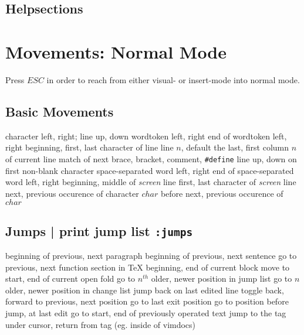
\def\content{\uppercase{vim}}
\def\shortcontent{\content}
\def\versionnumber{1.6}  %
\def\version{v\versionnumber\ \month\ \year}


\mytitle

\shortintro
\shortintroVim

\subsection{Helpsections}	{}

\section{Movements: Normal Mode}	{Press $ESC$ in order to reach from either visual- or insert-mode into normal mode.}
\subsection{Basic Movements}{}
	{character left, right; line up, down }
	{word\or token left, right }
	{end of word\or token left, right}
	{beginning, first, last character of line}
	{line $n$, default the last, first}
	{column $n$ of current line}
\cmdS{\% }	{match of next brace, bracket, comment, {\tt\#define}}
\cmdS{- + }	{line up, down on first non-blank character}
	{space-separated word left, right}
	{end of space-separated word left, right}
	{beginning, middle of {\it screen\/} line}
	{first, last character of {\it screen\/} line}
	{next, previous occurence of character $char$}
	{before next, previous occurence of $char$}

\subsection{Jumps | {print jump list {\tt :jumps}}}	{}
\cmdS{\lapos\ \rapos }	{beginning of previous, next paragraph}
\cmdS{( ) }	{beginning of previous, next sentence}
\cmdS{[[\ ]]}	{go to previous, next function \or \bs section in \TeX}
\cmdS{[\lapos\ ]\rapos}	{beginning, end of current block}
	{move to start, end of current open fold}
	{go to $n^{th}$ older, newer position in jump list}
	{go to $n$ older, newer position in change list}
	{jump back on last edited line}
	{toggle back, forward to previous, next position}
	{go to last exit position}
	{go to position before jump, at last edit}
	{go to start, end of previously operated text}
\cmdS{\ctrl ] \ctrl T }	{jump to the tag under cursor, return from tag (eg. inside of vimdocs)}

